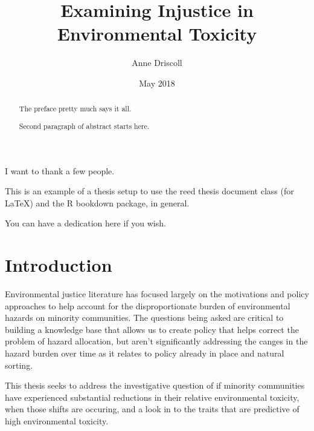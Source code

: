 \documentclass[12pt,twoside]{dukestatscithesis}
\title{Examining Injustice in Environmental Toxicity}
\author{Anne Driscoll}
\date{May 2018}
\theoremstyle{definition}
\theoremstyle{definition}
\theoremstyle{definition}
\theoremstyle{remark}
\begin{document}
  \maketitle

\frontmatter %
\pagestyle{empty} %
  \begin{acknowledgements}
    I want to thank a few people.
  \end{acknowledgements}
  \begin{preface}
    This is an example of a thesis setup to use the reed thesis document
    class (for LaTeX) and the R bookdown package, in general.
  \end{preface}
  \hypersetup{linkcolor=black}
  \setcounter{tocdepth}{2}
  \tableofcontents

  \listoftables

  \listoffigures
  \begin{abstract}
    The preface pretty much says it all. \par
    
    Second paragraph of abstract starts here.
  \end{abstract}
  \begin{dedication}
    You can have a dedication here if you wish.
  \end{dedication}
\mainmatter %
\pagestyle{fancyplain} %

\chapter*{Introduction}\label{introduction}

Environmental justice literature has focused largely on the motivations
and policy approaches to help account for the disproportionate burden of
environmental hazards on minority communities. The questions being asked
are critical to building a knowledge base that allows us to create
policy that helps correct the problem of hazard allocation, but aren't
significantly addressing the canges in the hazard burden over time as it
relates to policy already in place and natural sorting.

This thesis seeks to address the investigative question of if minority
communities have experienced substantial reductions in their relative
environmental toxicity, when those shifts are occuring, and a look in to
the traits that are predictive of high environmental toxicity.
\end{document}
